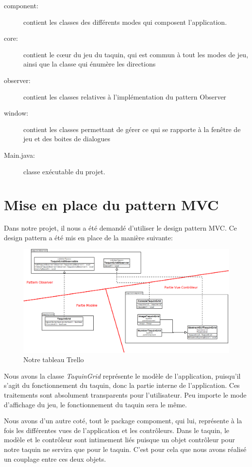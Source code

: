 		\begin{description}
			\item [component:] contient les classes des différents modes qui composent l’application.
			\item [core:] contient le cœur du jeu du taquin, qui est commun à tout les modes de jeu, ainsi que la classe qui énumère les directions
			\item [observer:] contient les classes relatives à l'implémentation du pattern Observer
			\item [window:] contient les classes permettant de gérer ce qui se rapporte à la fenêtre de jeu et des boites de dialogues
			\item [Main.java:] classe exécutable du projet.
		\end{description}

	\section{Mise en place du pattern MVC}

	Dans notre projet, il nous a été demandé d'utiliser le design pattern MVC. Ce design pattern a été mis en place de la manière suivante:

	\begin{figure}[H]
		\centering\includegraphics[width=1\textwidth, keepaspectratio]{img/diagramMVC.png}
		\caption{Notre tableau Trello}
		\label{Mise en place du M-VC}
	\end{figure}

	Nous avons la classe \textit{TaquinGrid} représente le modèle de l'application, puisqu'il s'agit du fonctionnement du taquin, donc la partie interne de l'application. Ces traitements sont absolument transparents pour l'utilisateur. Peu importe le mode d'affichage du jeu, le fonctionnement du taquin sera le même.

	Nous avons d'un autre coté, tout le package compoment, qui lui, représente à la fois les différentes vues de l'application et les contrôleurs. Dans le taquin, le modèle et le contrôleur sont intimement liés puisque un objet contrôleur pour notre taquin ne servira que pour le taquin. C'est pour cela que nous avons réalisé un couplage entre ces deux objets.

